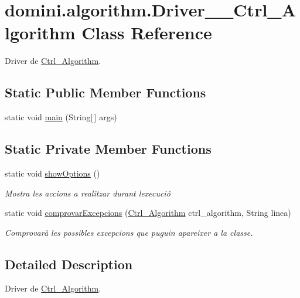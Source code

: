 \hypertarget{classdomini_1_1algorithm_1_1Driver____Ctrl__Algorithm}{}\section{domini.\+algorithm.\+Driver\+\_\+\+\_\+\+Ctrl\+\_\+\+Algorithm Class Reference}
\label{classdomini_1_1algorithm_1_1Driver____Ctrl__Algorithm}


Driver de \hyperlink{classdomini_1_1algorithm_1_1Ctrl__Algorithm}{Ctrl\+\_\+\+Algorithm}.  


\subsection*{Static Public Member Functions}
\begin{DoxyCompactItemize}
\item 
static void \hyperlink{classdomini_1_1algorithm_1_1Driver____Ctrl__Algorithm_a2aa6a8b8f8c0c991a11b30e2bd1f244e}{main} (String\mbox{[}$\,$\mbox{]} args)
\end{DoxyCompactItemize}
\subsection*{Static Private Member Functions}
\begin{DoxyCompactItemize}
\item 
static void \hyperlink{classdomini_1_1algorithm_1_1Driver____Ctrl__Algorithm_afad303731ad32c08c8dbffbf63b3fd9f}{show\+Options} ()
\begin{DoxyCompactList}\small\item\em Mostra les accions a realitzar durant l\textquotesingle{}execució \end{DoxyCompactList}\item 
static void \hyperlink{classdomini_1_1algorithm_1_1Driver____Ctrl__Algorithm_a38ad7761ecde80325d83ce2d2597a61b}{comprovar\+Excepcions} (\hyperlink{classdomini_1_1algorithm_1_1Ctrl__Algorithm}{Ctrl\+\_\+\+Algorithm} ctrl\+\_\+algorithm, String linea)
\begin{DoxyCompactList}\small\item\em Comprovarà les possibles excepcions que puguin apareixer a la classe. \end{DoxyCompactList}\end{DoxyCompactItemize}


\subsection{Detailed Description}
Driver de \hyperlink{classdomini_1_1algorithm_1_1Ctrl__Algorithm}{Ctrl\+\_\+\+Algorithm}. 

